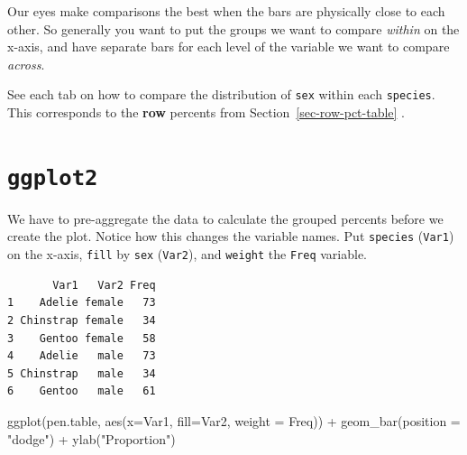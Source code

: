 \documentclass[
  letterpaper,
  DIV=11,
  numbers=noendperiod,
  oneside]{scrreprt}
\newenvironment{Shaded}{\begin{snugshade}}{\end{snugshade}}
\newcommand{\AttributeTok}[1]{\textcolor[rgb]{0.40,0.45,0.13}{#1}}
\newcommand{\CommentTok}[1]{\textcolor[rgb]{0.37,0.37,0.37}{#1}}
\newcommand{\FunctionTok}[1]{\textcolor[rgb]{0.28,0.35,0.67}{#1}}
\newcommand{\NormalTok}[1]{\textcolor[rgb]{0.00,0.23,0.31}{#1}}
\newcommand{\OtherTok}[1]{\textcolor[rgb]{0.00,0.23,0.31}{#1}}
\newcommand{\SpecialCharTok}[1]{\textcolor[rgb]{0.37,0.37,0.37}{#1}}
\newcommand{\StringTok}[1]{\textcolor[rgb]{0.13,0.47,0.30}{#1}}
\begin{document}
Our eyes make comparisons the best when the bars are physically close to
each other. So generally you want to put the groups we want to compare
\emph{within} on the x-axis, and have separate bars for each level of
the variable we want to compare \emph{across}.

See each tab on how to compare the distribution of \texttt{sex} within
each \texttt{species}. This corresponds to the \textbf{row} percents
from Section~\ref{sec-row-pct-table} .

\section{\texorpdfstring{\texttt{ggplot2}}{ggplot2}}

We have to pre-aggregate the data to calculate the grouped percents
before we create the plot. Notice how this changes the variable names.
Put \texttt{species} (\texttt{Var1}) on the x-axis, \texttt{fill} by
\texttt{sex} (\texttt{Var2}), and \texttt{weight} the \texttt{Freq}
variable. {}

\begin{Shaded}
\end{Shaded}

\begin{verbatim}
       Var1   Var2 Freq
1    Adelie female   73
2 Chinstrap female   34
3    Gentoo female   58
4    Adelie   male   73
5 Chinstrap   male   34
6    Gentoo   male   61
\end{verbatim}

\begin{Shaded}
\begin{Highlighting}[]
\FunctionTok{ggplot}\NormalTok{(pen.table, }\FunctionTok{aes}\NormalTok{(}\AttributeTok{x=}\NormalTok{Var1, }\AttributeTok{fill=}\NormalTok{Var2, }\AttributeTok{weight =}\NormalTok{ Freq)) }\SpecialCharTok{+} 
  \FunctionTok{geom\_bar}\NormalTok{(}\AttributeTok{position =} \StringTok{"dodge"}\NormalTok{)  }\SpecialCharTok{+} \FunctionTok{ylab}\NormalTok{(}\StringTok{"Proportion"}\NormalTok{)}
\end{Highlighting}
\end{Shaded}
\end{document}
